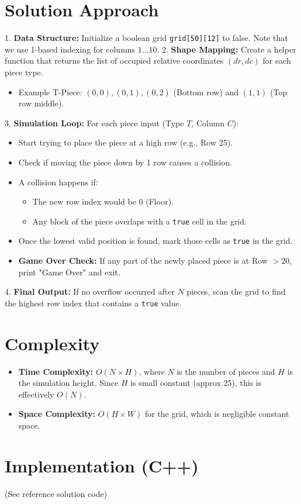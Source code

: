 \documentclass[11pt]{article}
\begin{document}
\section*{Solution Approach}
1. \textbf{Data Structure:} Initialize a boolean grid \texttt{grid[50][12]} to false. Note that we use 1-based indexing for columns $1 \dots 10$.
2. \textbf{Shape Mapping:} Create a helper function that returns the list of occupied relative coordinates $(dr, dc)$ for each piece type.
   \begin{itemize}
       \item Example T-Piece: $(0,0), (0,1), (0,2)$ (Bottom row) and $(1,1)$ (Top row middle).
   \end{itemize}
3. \textbf{Simulation Loop:} For each piece input (Type $T$, Column $C$):
   \begin{itemize}
       \item Start trying to place the piece at a high row (e.g., Row 25).
       \item Check if moving the piece down by 1 row causes a collision.
       \item A collision happens if:
       \begin{itemize}
           \item The new row index would be 0 (Floor).
           \item Any block of the piece overlaps with a \texttt{true} cell in the grid.
       \end{itemize}
       \item Once the lowest valid position is found, mark those cells as \texttt{true} in the grid.
       \item \textbf{Game Over Check:} If any part of the newly placed piece is at Row $> 20$, print "Game Over" and exit.
   \end{itemize}
4. \textbf{Final Output:} If no overflow occurred after $N$ pieces, scan the grid to find the highest row index that contains a \texttt{true} value.

\section*{Complexity}
\begin{itemize}
    \item \textbf{Time Complexity:} $O(N \times H)$, where $N$ is the number of pieces and $H$ is the simulation height. Since $H$ is small constant (approx 25), this is effectively $O(N)$.
    \item \textbf{Space Complexity:} $O(H \times W)$ for the grid, which is negligible constant space.
\end{itemize}

\section*{Implementation (C++)}
(See reference solution code)
\end{document}
